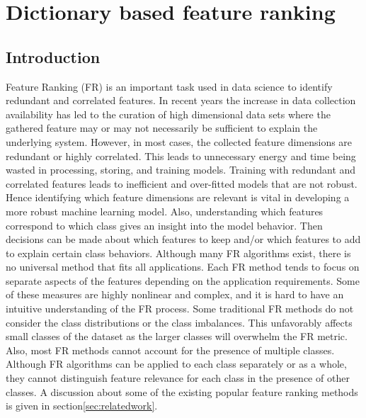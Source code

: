 \chapter{Dictionary based feature ranking}\label{ch:feature ranking}

\section{Introduction}

Feature Ranking (FR) is an important task used in data science to identify redundant and correlated features. In recent years the increase in data collection availability has led to the curation of high dimensional data sets where the gathered feature may or may not necessarily be sufficient to explain the underlying system. However, in most cases, the collected feature dimensions are redundant or highly correlated. This leads to unnecessary energy and time being wasted in processing, storing, and training models. Training with redundant and correlated features leads to inefficient and over-fitted models that are not robust. Hence identifying which feature dimensions are relevant is vital in developing a more robust machine learning model. Also, understanding which features correspond to which class gives an insight into the model behavior. Then decisions can be made about which features to keep and/or which features to add to explain certain class behaviors. Although many FR algorithms exist, there is no universal method that fits all applications. Each FR method tends to focus on separate aspects of the features depending on the application requirements. Some of these measures are highly nonlinear and complex, and it is hard to have an intuitive understanding of the FR process. Some traditional FR methods do not consider the class distributions or the class imbalances. This unfavorably affects small classes of the dataset as the larger classes will overwhelm the FR metric. Also, most FR methods cannot account for the presence of multiple classes. Although FR algorithms can be applied to each class separately or as a whole, they cannot distinguish feature relevance for each class in the presence of other classes. A discussion about some of the existing popular feature ranking methods is given in section\ref{sec:relatedwork}. 


